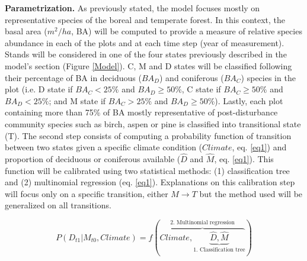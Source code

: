 \textbf{Parametrization.} As previously stated, the model focuses mostly on
representative species of the boreal and temperate forest. In this context,
the basal area ($m^2/ha$, BA) will be computed to provide a measure of relative
species abundance in each of the plots and at each time step (year of
measurement). Stands will be considered in one of the four states previously
described in the model's section (Figure \ref{Model}). C, M and D states will be
classified following their percentage of BA in deciduous ($BA_D$) and coniferous
($BA_C$) species in the plot (i.e. D state if $BA_C < 25\%$ and $BA_D \geq
50\%$, C state if ${BA}_C \geq 50\%$ and $BA_D < 25\%$; and M state if $BA_C >
25\%$ and $BA_D \geq 50\%$). Lastly, each plot containing more than 75\% of BA
mostly representative of post-disturbance community species such as birch,
aspen or pine is classified into transitional state (T). 
%
%
%
%
%
The second step
consists of computing a probability function of transition between two states
given a specific climate condition ($Climate$, eq. \ref{eq1}) and proportion
of deciduous or coniferous available ($\hat{D}$ and $\hat{M}$, eq.
\ref{eq1}). This function will be calibrated using two statistical methods:
(1) classification tree and (2) multinomial regression (eq. \ref{eq1}).
Explanations on this calibration step will focus only on a specific
transition, either $M \rightarrow T$ but the method used will be generalized
on all transitions.

\begin{equation}
	P(D_{t1}|M_{t0}, Climate) = f(\overbrace{Climate, \underbrace{\hat{D}, \hat{M}}_\text{1. Classification tree}}^\text{2. Multinomial regression})
\label{eq1}
\end{equation}

